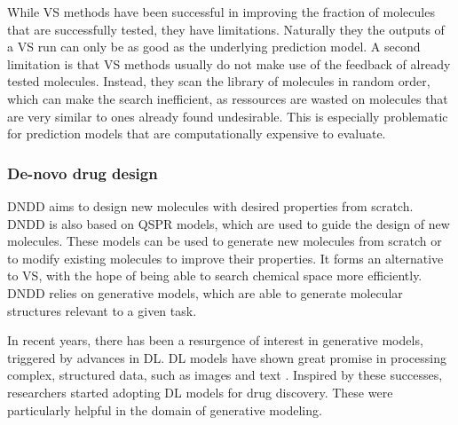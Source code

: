While \ac{VS} methods have been successful in improving 
the fraction of molecules that are successfully tested, they have limitations. 
Naturally they the outputs of a \ac{VS} run can only be as good as the
underlying prediction model. A second limitation is that \ac{VS} methods
usually do not make use of the feedback of already tested molecules.
Instead, they scan the library of molecules in random order, which 
can make the search inefficient, as ressources are wasted on molecules
that are very similar to ones already found undesirable.
This is especially problematic for prediction models that are 
computationally expensive to evaluate. 



\subsubsection{De-novo drug design}
\Ac{DNDD} aims to design new molecules with desired properties from scratch.
\Ac{DNDD} is also based on \ac{QSPR} models, which are used to guide the
design of new molecules. These models can be used to generate new molecules
from scratch or to modify existing molecules to improve their properties.
It forms an alternative to \ac{VS}, with the hope of being able to search
chemical space more efficiently. \ac{DNDD} relies on generative models, 
which are able to generate molecular structures relevant to a given task.

In recent years, there has been a resurgence of interest in generative models,
triggered by advances in \ac{DL}. \ac{DL} models have shown great promise in
processing complex, structured data, such as images and text \citep{todo}.
Inspired by these successes, researchers started adopting \ac{DL} models for 
drug discovery. These were particularly helpful in the domain of generative
modeling.

